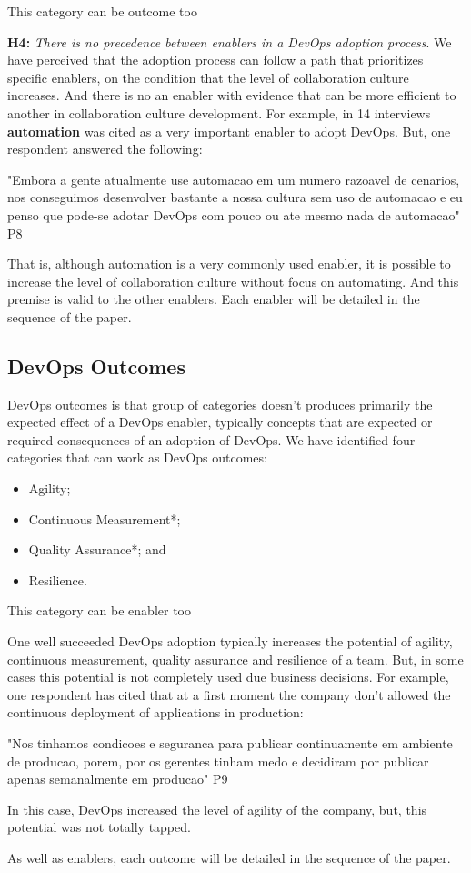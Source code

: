 \footnotesize * This category can be outcome too

\normalsize
\textbf{H4:} \textit{There is no precedence between enablers in a DevOps adoption process}. We have perceived that the adoption process can follow a path that prioritizes specific enablers, on the condition that the level of collaboration culture increases. And there is no an enabler with evidence that can be more efficient to another in collaboration culture development. For example, in 14 interviews \textbf{automation} was cited as a very important enabler to adopt DevOps. But, one respondent answered the following:

"Embora a gente atualmente use automacao em um numero razoavel de cenarios, nos conseguimos desenvolver bastante a nossa cultura sem uso de automacao e eu penso que pode-se adotar DevOps com pouco ou ate mesmo nada de automacao" P8

That is, although automation is a very commonly used enabler, it is possible to increase the level of collaboration culture without focus on automating. And this premise is valid to the other enablers. Each enabler will be detailed in the sequence of the paper.

\subsection{DevOps Outcomes}
DevOps outcomes is that group of categories doesn't produces primarily the expected effect of a DevOps enabler, typically concepts that are expected or required consequences of an adoption of DevOps. We have identified four categories that can work as DevOps outcomes:

\begin{itemize}
\item Agility;
\item Continuous Measurement*;
\item Quality Assurance*; and
\item Resilience.
\end{itemize}

\footnotesize * This category can be enabler too


\normalsize
One well succeeded DevOps adoption typically increases the potential of agility, continuous measurement, quality assurance and resilience of a team. But, in some cases this potential is not completely used due business decisions. For example, one respondent has cited that at a first moment the company don't allowed the continuous deployment of applications in production:

"Nos tinhamos condicoes e seguranca para publicar continuamente em ambiente de producao, porem, por os gerentes tinham medo e decidiram por publicar apenas semanalmente em producao" P9

In this case, DevOps increased the level of agility of the company, but, this potential was not totally tapped.

As well as enablers, each outcome will be detailed in the sequence of the paper.
